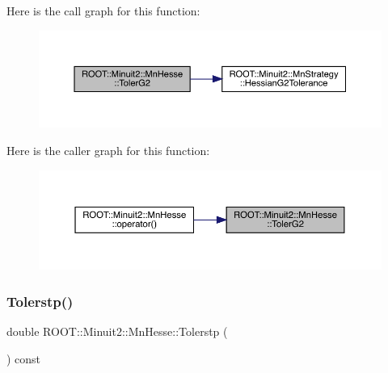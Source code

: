 Here is the call graph for this function\+:
\nopagebreak
\begin{figure}[H]
\begin{center}
\leavevmode
\includegraphics[width=350pt]{d1/d02/classROOT_1_1Minuit2_1_1MnHesse_ae625b94360c1c974854b63aedbcc6a1a_cgraph}
\end{center}
\end{figure}
Here is the caller graph for this function\+:\nopagebreak
\begin{figure}[H]
\begin{center}
\leavevmode
\includegraphics[width=350pt]{d1/d02/classROOT_1_1Minuit2_1_1MnHesse_ae625b94360c1c974854b63aedbcc6a1a_icgraph}
\end{center}
\end{figure}
\mbox{\label{classROOT_1_1Minuit2_1_1MnHesse_a4b36474a0d157ecb634bbf5d120db669}} 
\subsubsection{\texorpdfstring{Tolerstp()}{Tolerstp()}\hspace{0.1cm}{\footnotesize\ttfamily [1/2]}}
{\footnotesize\ttfamily double R\+O\+O\+T\+::\+Minuit2\+::\+Mn\+Hesse\+::\+Tolerstp (\begin{DoxyParamCaption}{ }\end{DoxyParamCaption}) const\hspace{0.3cm}{\ttfamily [inline]}}

